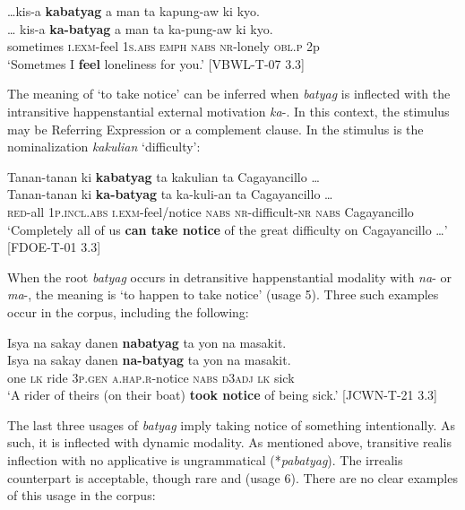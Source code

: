 \ea
 …kis-a  \textbf{kabatyag}   a  man  ta  kapung-aw  ki  kyo. \\\smallskip
\gll  … kis-a  \textbf{ka-batyag}   a  man  ta  ka-pung-aw  ki  kyo. \\
{} sometimes  \textsc{i.exm}-feel  1\textsc{s.abs}  \textsc{emph}  \textsc{nabs}  \textsc{nr}-lonely  \textsc{obl.p}  2p \\
\glt ‘Sometmes I \textbf{feel} loneliness for you.’ [VBWL-T-07 3.3]
\z

The meaning of ‘to take notice’ can be inferred when \textit{batyag} is inflected with the intransitive happenstantial external motivation \textit{ka}{}-. In this context, the stimulus may be Referring Expression or a complement clause. In  the stimulus is the nominalization \textit{kakulian} ‘difficulty’:

\ea
\label{bkm:Ref121399400}
Tanan-tanan  ki  \textbf{kabatyag}  ta  kakulian  ta  Cagayancillo … \\\smallskip
\gll Tanan-tanan  ki  \textbf{ka-batyag}  ta  ka-kuli-an  ta  Cagayancillo … \\
\textsc{red}-all  1\textsc{p.incl.abs}  \textsc{i.exm}-feel/notice  \textsc{nabs}  \textsc{nr}-difficult-\textsc{nr}  \textsc{nabs}  Cagayancillo \\
\glt ‘Completely all of us \textbf{can take notice} of the great  difficulty on Cagayancillo  …’ [FDOE-T-01 3.3]
\z


When the root \textit{batyag} occurs in detransitive happenstantial modality with \textit{na}- or \textit{ma}-, the meaning is ‘to happen to take notice’ (usage 5). Three such examples occur in the corpus, including the following:

\ea
\label{bkm:Ref122533197}
Isya  na  sakay  danen  \textbf{nabatyag}  ta  yon  na  masakit. \\\smallskip
\gll Isya  na  sakay  danen  \textbf{na-batyag}  ta  yon  na  masakit. \\
one  \textsc{lk}  ride  3\textsc{p.gen}  \textsc{a.hap.r}-notice  \textsc{nabs}  \textsc{d3adj}  \textsc{lk}  sick \\
\glt  ‘A rider of theirs (on their boat) \textbf{took notice} of being sick.’ [JCWN-T-21 3.3]
\z

The last three usages of \textit{batyag} imply taking notice of something intentionally. As such, it is inflected with dynamic modality. As mentioned above, transitive realis inflection with no applicative is ungrammatical (*\textit{pabatyag}). The irrealis counterpart is acceptable, though rare  and  (usage 6). There are no clear examples of this usage in the corpus: 

